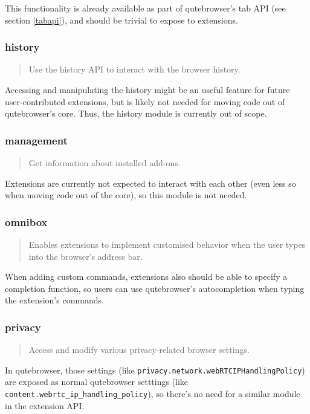 \documentclass[a4paper,parskip=full,DIV=14,BCOR=15mm]{scrreprt}
\begin{document}
This functionality is already available as part of qutebrowser's tab API (see
section \ref{tabapi}), and should be trivial to expose to extensions.

\subsubsection{history}
\begin{quote}
Use the history API to interact with the browser history.
\end{quote}

Accessing and manipulating the history might be an useful feature for future
user-contributed extensions, but is likely not needed for moving code out of
qutebrowser's core. Thus, the history module is currently out of scope.

\subsubsection{management}
\begin{quote}
Get information about installed add-ons.
\end{quote}

Extensions are currently not expected to interact with each other (even less so
when moving code out of the core), so this module is not needed.

\subsubsection{omnibox}
\begin{quote}
Enables extensions to implement customised behavior when the user types into the
browser's address bar.
\end{quote}

When adding custom commands, extensions also should be able to specify a
completion function, so users can use qutebrowser's autocompletion when typing
the extension's commands.

\subsubsection{privacy}
\begin{quote}
Access and modify various privacy-related browser settings.
\end{quote}

In qutebrowser, those settings (like
\verb|privacy.network.webRTCIPHandlingPolicy|) are exposed as normal qutebrowser
setttings (like \verb|content.webrtc_ip_handling_policy|), so there's no need
for a similar module in the extension API.
\end{document}

